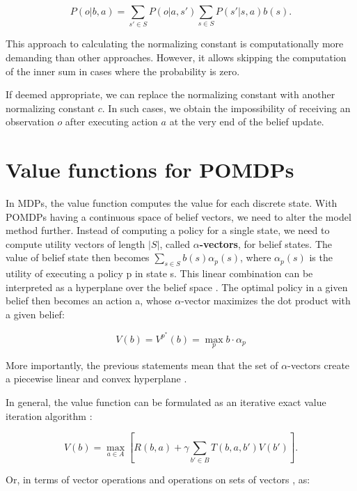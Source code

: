 \begin{equation} P(o|b, a) = \sum_{s' \in S} P(o|a, s')\sum_{s \in S} P(s'|s, a)b(s).\end{equation}

This approach to calculating the normalizing constant is computationally more demanding than other approaches. However, it allows skipping the computation of the inner sum in cases where the probability is zero.

If deemed appropriate, we can replace the normalizing constant with another normalizing constant $c$. In such cases, we obtain the impossibility of receiving an observation $o$ after executing action $a$ at the very end of the belief update.


\section{Value functions for POMDPs}
In MDPs, the value function computes the value for each discrete state. With POMDPs having a continuous space of belief vectors, we need to alter the model method further. Instead of computing a policy for a single state, we need to compute utility vectors of length $|S|$, called \textbf{$\alpha$-vectors}, for belief states. The value of belief state then becomes $\sum_{s \in S} b(s) \alpha_p(s)$, where $\alpha_p(s)$ is the utility of executing a policy p in state s. This linear combination can be interpreted as a hyperplane over the belief space \cite{pbvi}. The optimal policy in a given belief then becomes an action a, whose $\alpha$-vector maximizes the dot product with a given belief:

\begin{equation} V(b) = V^{p}^{*}(b) = \operatorname*{max}_p b \cdot \alpha_p \end{equation}

More importantly, the previous statements mean that the set of $\alpha$-vectors create a piecewise linear and convex hyperplane \cite{russel2010}.

In general, the value function can be formulated as an iterative exact value iteration algorithm \cite{Shani2013}:

\begin{equation} V(b) = \max_{a \in A} [R(b, a) + \gamma \sum_{b' \in B} T(b, a, b') V(b')].\end{equation}

Or, in terms of vector operations and operations on sets of vectors \cite{Shani2013}, as:

